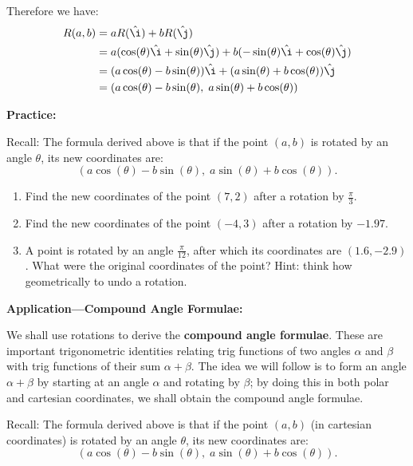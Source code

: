 \documentclass{article}
\def\ihat{\hat{\i}}
\def\jhat{\hat{\j}}
\begin{document}
Therefore we have:
\begin{align*}
R(a,b) &=aR(\ihat)+bR(\jhat)\\
&= a(\cos(\theta)\ihat+\sin(\theta)\jhat)+b(-\sin(\theta)\ihat+\cos(\theta)\jhat)\\
&= (a\cos(\theta)-b\sin(\theta))\ihat+(a\sin(\theta)+b\cos(\theta))\jhat\\
&=\left(a\cos(\theta)-b\sin(\theta),\; a\sin(\theta)+b\cos(\theta)\right)
\end{align*}



\clearpage


\textbf{Practice:}

\vspace{5mm}

Recall: The formula derived above is that if the point $(a,b)$ is rotated by an angle $\theta$, its new coordinates are:
\[\left(a\cos(\theta)-b\sin(\theta),\; a\sin(\theta)+b\cos(\theta)\right).\]

\begin{enumerate}
\item Find the new coordinates of the point $(7,2)$ after a rotation by $\frac{\pi}{3}$.
\item Find the new coordinates of the point $(-4,3)$ after a rotation by $-1.97$.
\item A point is rotated by an angle $\frac{\pi}{12}$, after which its coordinates are $(1.6,-2.9)$. What were the original coordinates of the point? Hint: think how geometrically to undo a rotation.
\end{enumerate}

\clearpage


\textbf{Application---Compound Angle Formulae:}

\vspace{5mm}

We shall use rotations to derive the \textbf{compound angle formulae}. These are important trigonometric identities relating trig functions of two angles $\alpha$ and $\beta$ with trig functions of their sum $\alpha+\beta$. The idea we will follow is to form an angle $\alpha+\beta$ by starting at an angle $\alpha$ and rotating by $\beta$; by doing this in both polar and cartesian coordinates, we shall obtain the compound angle formulae.

Recall: The formula derived above is that if the point $(a,b)$ (in cartesian coordinates) is rotated by an angle $\theta$, its new coordinates are:
\[\left(a\cos(\theta)-b\sin(\theta),\; a\sin(\theta)+b\cos(\theta)\right).\]
\end{document}
